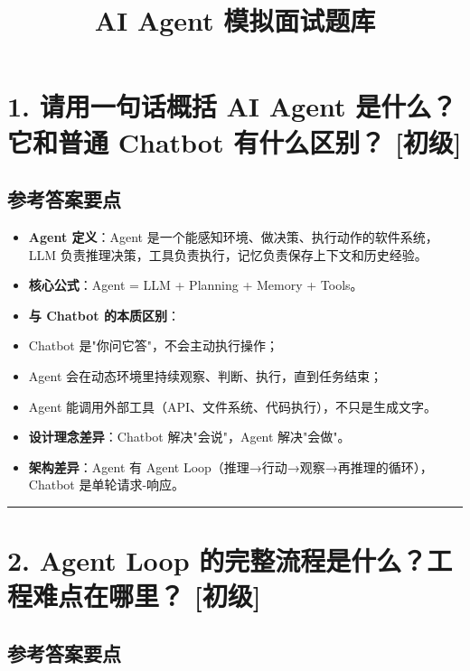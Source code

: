 \documentclass[9pt,a4paper,twocolumn]{ctexart}
\newcommand{\lvchu}{\usebox{\badgechubox}}
\def\lvchu{[初级]}%
\begin{document}
\title{AI Agent 模拟面试题库}
\date{}
\maketitle
{}



\section*{1. 请用一句话概括 AI Agent 是什么？它和普通 Chatbot 有什么区别？ \lvchu{}}


\subsection*{参考答案要点}

\begin{itemize}[itemsep=1pt, topsep=2pt]
  \item \textbf{Agent 定义}：Agent 是一个能感知环境、做决策、执行动作的软件系统，LLM 负责推理决策，工具负责执行，记忆负责保存上下文和历史经验。
  \item \textbf{核心公式}：Agent = LLM + Planning + Memory + Tools。
  \item \textbf{与 Chatbot 的本质区别}：
  \item Chatbot 是"你问它答"，不会主动执行操作；
  \item Agent 会在动态环境里持续观察、判断、执行，直到任务结束；
  \item Agent 能调用外部工具（API、文件系统、代码执行），不只是生成文字。
  \item \textbf{设计理念差异}：Chatbot 解决"会说"，Agent 解决"会做"。
  \item \textbf{架构差异}：Agent 有 Agent Loop（推理→行动→观察→再推理的循环），Chatbot 是单轮请求-响应。
\end{itemize}


\vspace{2pt}
\noindent\rule{\columnwidth}{0.3pt}\vspace{2pt}



\section*{2. Agent Loop 的完整流程是什么？工程难点在哪里？ \lvchu{}}


\subsection*{参考答案要点}
\end{document}
